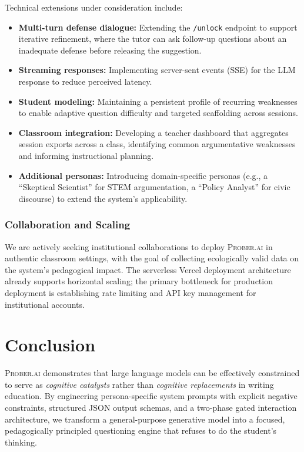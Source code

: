 \documentclass[11pt,a4paper]{article}
\begin{document}
Technical extensions under consideration include:
\begin{itemize}[leftmargin=*]
    \item \textbf{Multi-turn defense dialogue:} Extending the \texttt{/unlock} endpoint to support iterative refinement, where the tutor can ask follow-up questions about an inadequate defense before releasing the suggestion.
    \item \textbf{Streaming responses:} Implementing server-sent events (SSE) for the LLM response to reduce perceived latency.
    \item \textbf{Student modeling:} Maintaining a persistent profile of recurring weaknesses to enable adaptive question difficulty and targeted scaffolding across sessions.
    \item \textbf{Classroom integration:} Developing a teacher dashboard that aggregates session exports across a class, identifying common argumentative weaknesses and informing instructional planning.
    \item \textbf{Additional personas:} Introducing domain-specific personas (e.g., a ``Skeptical Scientist'' for STEM argumentation, a ``Policy Analyst'' for civic discourse) to extend the system's applicability.
\end{itemize}

\subsubsection{Collaboration and Scaling}

We are actively seeking institutional collaborations to deploy \textsc{Prober.ai} in authentic classroom settings, with the goal of collecting ecologically valid data on the system's pedagogical impact. The serverless Vercel deployment architecture already supports horizontal scaling; the primary bottleneck for production deployment is establishing rate limiting and API key management for institutional accounts.

\section{Conclusion}
\label{sec:conclusion}

\textsc{Prober.ai} demonstrates that large language models can be effectively constrained to serve as \textit{cognitive catalysts} rather than \textit{cognitive replacements} in writing education. By engineering persona-specific system prompts with explicit negative constraints, structured JSON output schemas, and a two-phase gated interaction architecture, we transform a general-purpose generative model into a focused, pedagogically principled questioning engine that refuses to do the student's thinking.
\end{document}
